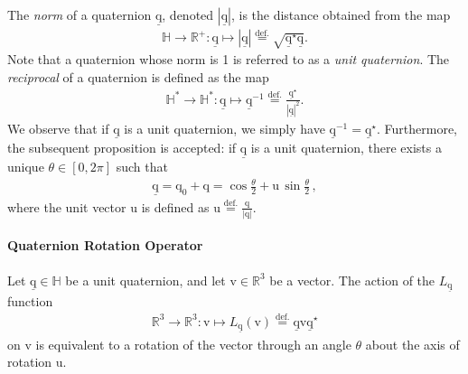 \noindent The \textit{norm} of a quaternion $\underline{\bm{\mathrm{q}}}$, denoted $|\underline{\bm{\mathrm{q}}}|$, is the distance obtained from the map 
\begin{align*}
	\mathbb{H}\rightarrow\mathbb{R}^+:\underline{\bm{\mathrm{q}}}\mapsto|\underline{\bm{\mathrm{q}}}|\stackrel{\text{def.}}{=}\sqrt{\underline{\bm{\mathrm{q}}}^\star\underline{\bm{\mathrm{q}}}}.
\end{align*} 
Note that a quaternion whose norm is 1 is referred to as a \textit{unit quaternion}. The \textit{reciprocal} of a quaternion is defined as the map
\begin{align*}
	\mathbb{H}^*\rightarrow\mathbb{H}^*:\underline{\bm{\mathrm{q}}}\mapsto\underline{\bm{\mathrm{q}}}^{-1}\stackrel{\text{def.}}{=}\frac{\underline{\bm{\mathrm{q}}}^\star}{|\underline{\bm{\mathrm{q}}}|^2}.
\end{align*} 
We observe that if $\underline{\bm{\mathrm{q}}}$ is a unit quaternion, we simply have $\underline{\bm{\mathrm{q}}}^{-1}=\underline{\bm{\mathrm{q}}}^\star$. Furthermore, the subsequent proposition is accepted: if $\underline{\bm{\mathrm{q}}}$ is a unit quaternion, there exists a unique $\theta\in[0,2\pi]$ such that
\begin{align*}
	\underline{\bm{\mathrm{q}}} = \mathrm{q}_0 + \bm{\mathrm{q}}=\cos\frac{\theta}{2}+\bm{\mathrm{u}}\,\sin\frac{\theta}{2}\,,
\end{align*}
where the unit vector $\bm{\mathrm{u}}$ is defined as $\bm{\mathrm{u}}\stackrel{\text{def.}}{=}\frac{\bm{\mathrm{q}}}{|\bm{\mathrm{q}}|}$.

\setlength{\belowdisplayskip}{0.15cm}

\paragraph{Quaternion Rotation Operator} Let $\underline{\bm{\mathrm{q}}}\in\mathbb{H}$ be a unit quaternion, and let $\bm{\mathrm{v}}\in\mathbb{R}^3$ be a vector. The action of the $L_{\underline{\bm{\mathrm{q}}}}$ function 
\begin{align*}
	\mathbb{R}^3\rightarrow\mathbb{R}^3:\bm{\mathrm{v}}\mapsto L_{\underline{\bm{\mathrm{q}}}}(\bm{\mathrm{v}}) \stackrel{\text{def.}}{=} \underline{\bm{\mathrm{q}}}\bm{\mathrm{v}}\underline{\bm{\mathrm{q}}}^\star
\end{align*}
on $\bm{\mathrm{v}}$ is equivalent to a rotation of the vector through an angle $\theta$ about the axis of rotation $\bm{\mathrm{u}}$.

